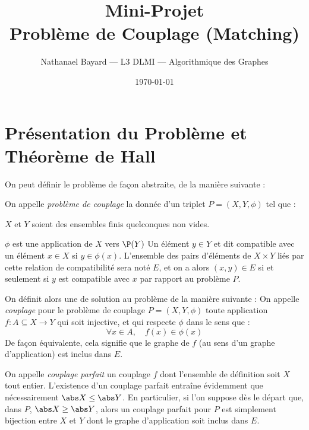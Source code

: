 








\author{Nathanael Bayard --- L3 DLMI --- Algorithmique des Graphes}
\title{Mini-Projet \\ Problème de Couplage (Matching)}
\date{\today}
    
 \maketitle
\section{Présentation du Problème et Théorème de Hall}
On peut définir le problème de façon abstraite, de la manière suivante :

\SEP\jdefi On appelle \emph{problème de couplage} la donnée d'un triplet $P = (X,Y,\phi)$ tel que :
\mathL
\item $X$ et $Y$ soient des ensembles finis quelconques non vides.
\item $\phi$ est une application de $X$ vers $\P(Y)$
\endL
Un élément $y \in Y$ et dit compatible avec un élément $x \in X$ si $y \in \phi(x)$. L'ensemble des pairs d'éléments de $X \times Y$ liés par cette relation de compatibilité sera noté $E$, et on a alors $(x,y) \in E$ si et seulement si $y$ est compatible avec $x$ par rapport au problème $P$.
\SEP

On définit alors une de solution au problème de la manière suivante :
\SEP\jdefi On appelle \emph{couplage} pour le problème de couplage $P = (X,Y,\phi)$ toute application $f : A \subseteq X \to Y$ qui soit injective, et qui respecte $\phi$ dans le sens que :
\[ \forall x \in A, \quad f(x) \in \phi(x) \]
De façon équivalente, cela signifie que le graphe de $f$ (au sens d'un graphe d'application) est inclus dans $E$.

On appelle \emph{couplage parfait} un couplage $f$ dont l'ensemble de définition soit $X$ tout entier. L'existence d'un couplage parfait entraîne évidemment que nécessairement $\abs X \leq \abs Y$. En particulier, si l'on suppose dès le départ que, dans $P$,  $\abs X \geq \abs Y$, alors un couplage parfait pour $P$ est simplement bijection entre $X$ et $Y$ dont le graphe d'application soit inclus dans $E$.

